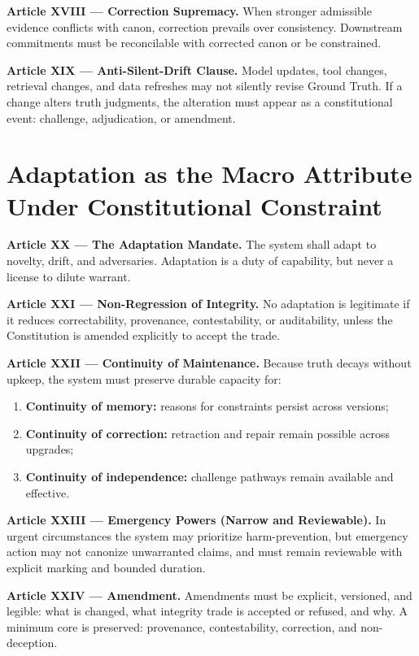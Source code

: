 \documentclass[11pt]{article}
\theoremstyle{defstyle}
\theoremstyle{mapstyle}
\begin{document}
\textbf{Article XVIII --- Correction Supremacy.}
When stronger admissible evidence conflicts with canon, correction prevails over consistency. Downstream commitments must be reconcilable with corrected canon or be constrained.

\textbf{Article XIX --- Anti-Silent-Drift Clause.}
Model updates, tool changes, retrieval changes, and data refreshes may not silently revise Ground Truth. If a change alters truth judgments, the alteration must appear as a constitutional event: challenge, adjudication, or amendment.

\clearpage

\section{Adaptation as the Macro Attribute Under Constitutional Constraint}
\label{partv:adaptation}

\textbf{Article XX --- The Adaptation Mandate.}
The system shall adapt to novelty, drift, and adversaries. Adaptation is a duty of capability, but never a license to dilute warrant.

\textbf{Article XXI --- Non-Regression of Integrity.}
No adaptation is legitimate if it reduces correctability, provenance, contestability, or auditability, unless the Constitution is amended explicitly to accept the trade.

\textbf{Article XXII --- Continuity of Maintenance.}
Because truth decays without upkeep, the system must preserve durable capacity for:
\begin{enumerate}
  \item \textbf{Continuity of memory:} reasons for constraints persist across versions;
  \item \textbf{Continuity of correction:} retraction and repair remain possible across upgrades;
  \item \textbf{Continuity of independence:} challenge pathways remain available and effective.
\end{enumerate}

\textbf{Article XXIII --- Emergency Powers (Narrow and Reviewable).}
In urgent circumstances the system may prioritize harm-prevention, but emergency action may not canonize unwarranted claims, and must remain reviewable with explicit marking and bounded duration.

\textbf{Article XXIV --- Amendment.}
Amendments must be explicit, versioned, and legible: what is changed, what integrity trade is accepted or refused, and why. A minimum core is preserved: provenance, contestability, correction, and non-deception.
\end{document}
